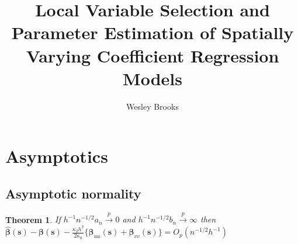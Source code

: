 \documentclass[authoryear, review, 11pt]{elsarticle}
\title{Local Variable Selection and Parameter Estimation of Spatially Varying Coefficient Regression Models}
\author{Wesley Brooks}
\date{}                                           %
\newtheorem{theorem}{Theorem}[section]
\begin{document}

    \maketitle

    \section{Asymptotics}
    \subsection{Asymptotic normality}
    \begin{theorem}\label{theorem:consistency}     
        If $h^{-1} n^{-1/2} a_n \xrightarrow{p} 0$ and $h^{-1} n^{-1/2} b_n \xrightarrow{p} \infty$ then $\hat{\bm{\beta}}(\bm{s}) - \bm{\beta}(\bm{s}) - \frac{\kappa_2 h^2}{2 \kappa_0} \{ \bm{\beta}_{uu}(\bm{s}) + \bm{\beta}_{vv}(\bm{s}) \} = O_p(n^{-1/2} h^{-1} )$
    \end{theorem}
  
\end{document}
